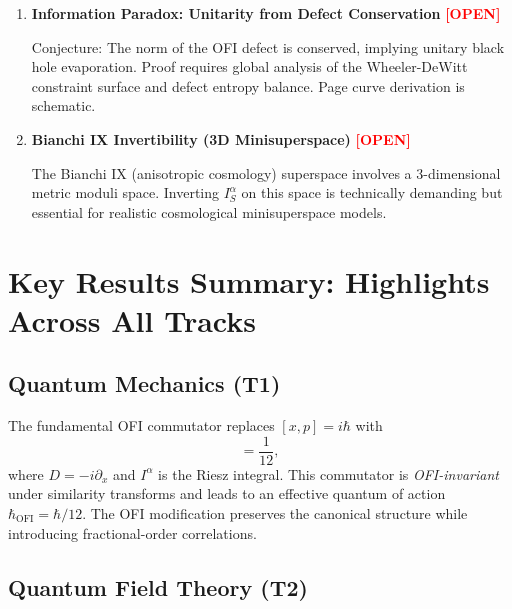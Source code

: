 \documentclass[12pt,a4paper]{article}
\theoremstyle{definition}
\newcommand{\OPEN}[1]{\textbf{\textcolor{red}{[OPEN]}}}
\newcommand{\Ialpha}{I^{\alpha}}
\newcommand{\OFI}{\text{OFI}}
\newcommand{\hbarOFI}{\hbar_{\OFI}}
\begin{document}
\begin{enumerate}
\item \textbf{Information Paradox: Unitarity from Defect Conservation} \OPEN{OPEN}

   Conjecture: The norm of the OFI defect is conserved, implying unitary black hole evaporation. Proof requires global analysis of the Wheeler-DeWitt constraint surface and defect entropy balance. Page curve derivation is schematic.

\item \textbf{Bianchi IX Invertibility (3D Minisuperspace)} \OPEN{TECHNICAL}

   The Bianchi IX (anisotropic cosmology) superspace involves a 3-dimensional metric moduli space. Inverting $\Ialpha_S$ on this space is technically demanding but essential for realistic cosmological minisuperspace models.
\end{enumerate}

\newpage

\section{Key Results Summary: Highlights Across All Tracks}

\subsection{Quantum Mechanics (T1)}

\begin{tcolorbox}[colback=blue!10,colframe=blue!75!black,title=T1 Highlight: Uncertainty Principle and Commutators]
The fundamental OFI commutator replaces $[x,p] = i\hbar$ with
\begin{equation}
[\Ialpha D, D\Ialpha] = \frac{1}{12},
\end{equation}
where $D = -i\partial_x$ and $\Ialpha$ is the Riesz integral. This commutator is \textit{OFI-invariant} under similarity transforms and leads to an effective quantum of action $\hbarOFI = \hbar/12$. The OFI modification preserves the canonical structure while introducing fractional-order correlations.
\end{tcolorbox}

\subsection{Quantum Field Theory (T2)}
\end{document}
